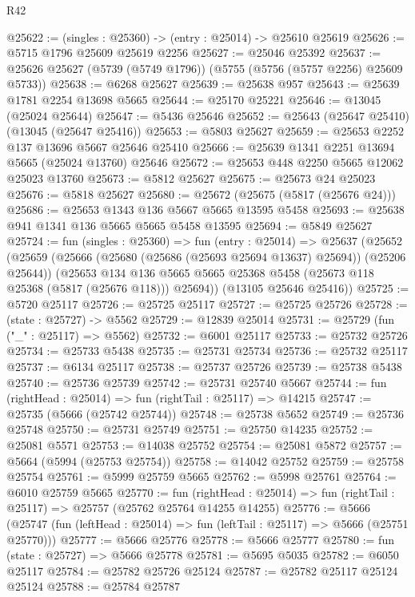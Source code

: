 \begin{lexlean}{R42}
\begin{coremodule}
@25622 := (singles : @25360) -> (entry : @25014) -> @25610 @25619
@25626 := @5715 @1796 @25609 @25619 @2256
@25627 := @25046 @25392
@25637 := @25626 @25627 (@5739 (@5749 @1796)) (@5755 (@5756 (@5757 @2256) @25609 @5733))
@25638 := @6268 @25627
@25639 := @25638 @957
@25643 := @25639 @1781 @2254 @13698 @5665
@25644 := @25170 @25221
@25646 := @13045 (@25024 @25644)
@25647 := @5436 @25646
@25652 := @25643 (@25647 @25410) (@13045 (@25647 @25416))
@25653 := @5803 @25627
@25659 := @25653 @2252 @137 @13696 @5667 @25646 @25410
@25666 := @25639 @1341 @2251 @13694 @5665 (@25024 @13760) @25646
@25672 := @25653 @448 @2250 @5665 @12062 @25023 @13760
@25673 := @5812 @25627
@25675 := @25673 @24 @25023
@25676 := @5818 @25627
@25680 := @25672 (@25675 (@5817 (@25676 @24)))
@25686 := @25653 @1343 @136 @5667 @5665 @13595 @5458
@25693 := @25638 @941 @1341 @136 @5665 @5665 @5458 @13595
@25694 := @5849 @25627
@25724 := fun (singles : @25360) =>
  fun (entry : @25014) =>
  @25637
    (@25652
      (@25659
        (@25666 (@25680 (@25686 (@25693 @25694 @13637) @25694)) (@25206 @25644))
        (@25653
          @134
          @136
          @5665
          @5665
          @25368
          @5458
          (@25673 @118 @25368 (@5817 (@25676 @118)))
          @25694))
      (@13105 @25646 @25416))
@25725 := @5720 @25117
@25726 := @25725 @25117
@25727 := @25725 @25726
@25728 := (state : @25727) -> @5562
@25729 := @12839 @25014
@25731 := @25729 (fun ("_" : @25117) => @5562)
@25732 := @6001 @25117
@25733 := @25732 @25726
@25734 := @25733 @5438
@25735 := @25731 @25734
@25736 := @25732 @25117
@25737 := @6134 @25117
@25738 := @25737 @25726
@25739 := @25738 @5438
@25740 := @25736 @25739
@25742 := @25731 @25740 @5667
@25744 := fun (rightHead : @25014) => fun (rightTail : @25117) => @14215
@25747 := @25735 (@5666 (@25742 @25744))
@25748 := @25738 @5652
@25749 := @25736 @25748
@25750 := @25731 @25749
@25751 := @25750 @14235
@25752 := @25081 @5571
@25753 := @14038 @25752
@25754 := @25081 @5872
@25757 := @5664 (@5994 (@25753 @25754))
@25758 := @14042 @25752
@25759 := @25758 @25754
@25761 := @5999 @25759 @5665
@25762 := @5998 @25761
@25764 := @6010 @25759 @5665
@25770 := fun (rightHead : @25014) =>
  fun (rightTail : @25117) => @25757 (@25762 @25764 @14255 @14255)
@25776 := @5666
    (@25747 (fun (leftHead : @25014) => fun (leftTail : @25117) => @5666 (@25751 @25770)))
@25777 := @5666 @25776
@25778 := @5666 @25777
@25780 := fun (state : @25727) => @5666 @25778
@25781 := @5695 @5035
@25782 := @6050 @25117
@25784 := @25782 @25726 @25124
@25787 := @25782 @25117 @25124 @25124
@25788 := @25784 @25787

\end{coremodule}
\end{lexlean}
